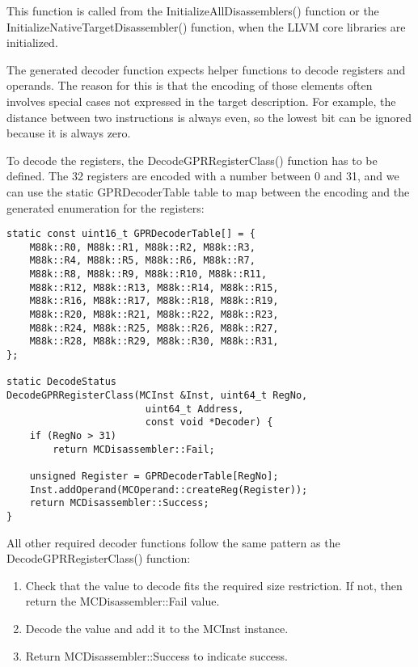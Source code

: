 This function is called from the InitializeAllDisassemblers() function or the InitializeNativeTargetDisassembler() function, when the LLVM core libraries are initialized.\par

The generated decoder function expects helper functions to decode registers and operands. The reason for this is that the encoding of those elements often involves special cases not expressed in the target description. For example, the distance between two instructions is always even, so the lowest bit can be ignored because it is always zero.\par

To decode the registers, the DecodeGPRRegisterClass() function has to be defined. The 32 registers are encoded with a number between 0 and 31, and we can use the static GPRDecoderTable table to map between the encoding and the generated enumeration for the registers:\par

\begin{lstlisting}[caption={}]
static const uint16_t GPRDecoderTable[] = {
	M88k::R0, M88k::R1, M88k::R2, M88k::R3,
	M88k::R4, M88k::R5, M88k::R6, M88k::R7,
	M88k::R8, M88k::R9, M88k::R10, M88k::R11,
	M88k::R12, M88k::R13, M88k::R14, M88k::R15,
	M88k::R16, M88k::R17, M88k::R18, M88k::R19,
	M88k::R20, M88k::R21, M88k::R22, M88k::R23,
	M88k::R24, M88k::R25, M88k::R26, M88k::R27,
	M88k::R28, M88k::R29, M88k::R30, M88k::R31,
};

static DecodeStatus
DecodeGPRRegisterClass(MCInst &Inst, uint64_t RegNo,
						uint64_t Address,
						const void *Decoder) {
	if (RegNo > 31)
		return MCDisassembler::Fail;
		
	unsigned Register = GPRDecoderTable[RegNo];
	Inst.addOperand(MCOperand::createReg(Register));
	return MCDisassembler::Success;
}
\end{lstlisting}

All other required decoder functions follow the same pattern as the DecodeGPRRegisterClass() function:\par

\begin{enumerate}
\item Check that the value to decode fits the required size restriction. If not, then return the MCDisassembler::Fail value.

\item Decode the value and add it to the MCInst instance.

\item Return MCDisassembler::Success to indicate success.

\end{enumerate}

